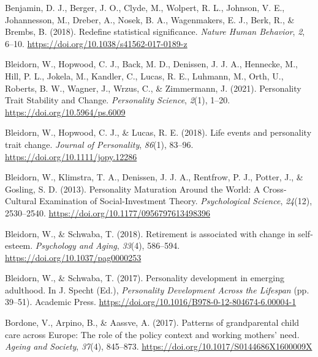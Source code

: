 \documentclass[
  english,
  man, noextraspace,floatsintext]{apa7}
\begin{document}
\leavevmode\hypertarget{ref-benjaminRedefineStatisticalSignificance2018}{}%
Benjamin, D. J., Berger, J. O., Clyde, M., Wolpert, R. L., Johnson, V. E., Johannesson, M., Dreber, A., Nosek, B. A., Wagenmakers, E. J., Berk, R., \& Brembs, B. (2018). Redefine statistical significance. \emph{Nature Human Behavior}, \emph{2}, 6--10. \url{https://doi.org/10.1038/s41562-017-0189-z}

\leavevmode\hypertarget{ref-bleidornPersonalityTraitStability2021}{}%
Bleidorn, W., Hopwood, C. J., Back, M. D., Denissen, J. J. A., Hennecke, M., Hill, P. L., Jokela, M., Kandler, C., Lucas, R. E., Luhmann, M., Orth, U., Roberts, B. W., Wagner, J., Wrzus, C., \& Zimmermann, J. (2021). Personality Trait Stability and Change. \emph{Personality Science}, \emph{2}(1), 1--20. \url{https://doi.org/10.5964/ps.6009}

\leavevmode\hypertarget{ref-bleidornLifeEventsPersonality2018}{}%
Bleidorn, W., Hopwood, C. J., \& Lucas, R. E. (2018). Life events and personality trait change. \emph{Journal of Personality}, \emph{86}(1), 83--96. \url{https://doi.org/10.1111/jopy.12286}

\leavevmode\hypertarget{ref-bleidornPersonalityMaturationWorld2013}{}%
Bleidorn, W., Klimstra, T. A., Denissen, J. J. A., Rentfrow, P. J., Potter, J., \& Gosling, S. D. (2013). Personality Maturation Around the World: A Cross-Cultural Examination of Social-Investment Theory. \emph{Psychological Science}, \emph{24}(12), 2530--2540. \url{https://doi.org/10.1177/0956797613498396}

\leavevmode\hypertarget{ref-bleidornRetirementAssociatedChange2018}{}%
Bleidorn, W., \& Schwaba, T. (2018). Retirement is associated with change in self-esteem. \emph{Psychology and Aging}, \emph{33}(4), 586--594. \url{https://doi.org/10.1037/pag0000253}

\leavevmode\hypertarget{ref-bleidornPersonalityDevelopmentEmerging2017}{}%
Bleidorn, W., \& Schwaba, T. (2017). Personality development in emerging adulthood. In J. Specht (Ed.), \emph{Personality Development Across the Lifespan} (pp. 39--51). Academic Press. \url{https://doi.org/10.1016/B978-0-12-804674-6.00004-1}

\leavevmode\hypertarget{ref-bordonePatternsGrandparentalChild2017}{}%
Bordone, V., Arpino, B., \& Aassve, A. (2017). Patterns of grandparental child care across Europe: The role of the policy context and working mothers' need. \emph{Ageing and Society}, \emph{37}(4), 845--873. \url{https://doi.org/10.1017/S0144686X1600009X}
\end{document}
